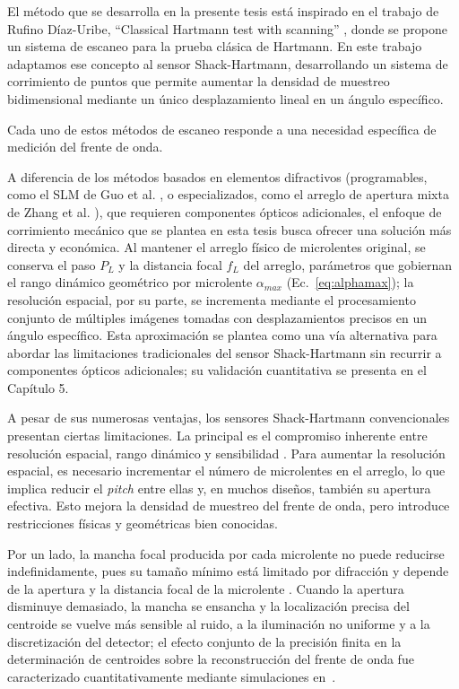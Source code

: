 \documentclass[letterpaper,12pt,oneside]{book}
\makeatletter
\renewcommand\subsection{\@startsection{subsection}{2}{\z@}{-3.25ex\@plus -1ex \@minus -.2ex}{1.5ex \@plus .2ex}{\normalfont\large\bfseries\raggedright}}
\makeatother
\begin{document}
El método que se desarrolla en la presente tesis está inspirado en el trabajo de Rufino
Díaz-Uribe, ``Classical Hartmann test with scanning'' \cite{Rufinoangulo}, donde se
propone un sistema de escaneo para la prueba clásica de Hartmann. En este trabajo
adaptamos ese concepto al sensor Shack-Hartmann, desarrollando un sistema de corrimiento
de puntos que permite aumentar la densidad de muestreo bidimensional mediante un único
desplazamiento lineal en un ángulo específico.

Cada uno de estos métodos de escaneo responde a una necesidad específica de medición del
frente de onda.

A diferencia de los métodos basados en elementos difractivos (programables, como el SLM de
Guo et al. \cite{GuoScanning}, o especializados, como el arreglo de apertura mixta de
Zhang et al. \cite{ZhangSLM}), que requieren componentes ópticos adicionales, el enfoque
de corrimiento mecánico que se plantea en esta tesis busca ofrecer una solución más
directa y económica. Al mantener el arreglo físico de microlentes original, se conserva el
paso $P_L$ y la distancia focal $f_L$ del arreglo, parámetros que gobiernan el rango
dinámico geométrico por microlente $\alpha_{max}$ (Ec.~\ref{eq:alphamax}); la resolución
espacial, por su parte, se incrementa mediante el procesamiento conjunto de múltiples
imágenes tomadas con desplazamientos precisos en un ángulo específico. Esta aproximación
se plantea como una vía alternativa para abordar las limitaciones tradicionales del sensor
Shack-Hartmann sin recurrir a componentes ópticos adicionales; su validación cuantitativa
se presenta en el Capítulo 5.


\subsection{Limitaciones actuales}

A pesar de sus numerosas ventajas, los sensores Shack-Hartmann convencionales presentan
ciertas limitaciones. La principal es el compromiso inherente entre resolución espacial,
rango dinámico y sensibilidad \cite{AkondiDubra,GuoScanning}. Para aumentar la resolución
espacial, es necesario incrementar el número de microlentes en el arreglo, lo que implica
reducir el \textit{pitch} entre ellas y, en muchos diseños, también su apertura efectiva.
Esto mejora la densidad de muestreo del frente de onda, pero introduce restricciones
físicas y geométricas bien conocidas.

Por un lado, la mancha focal producida por cada microlente no puede reducirse
indefinidamente, pues su tamaño mínimo está limitado por difracción y depende de la
apertura y la distancia focal de la microlente \cite{Goodman,MalacaraDoblado}. Cuando la
apertura disminuye demasiado, la mancha se ensancha y la localización precisa del
centroide se vuelve más sensible al ruido, a la iluminación no uniforme y a la
discretización del detector; el efecto conjunto de la precisión finita en la determinación
de centroides sobre la reconstrucción del frente de onda fue caracterizado
cuantitativamente mediante simulaciones en~\cite{Takato}.
\end{document}
